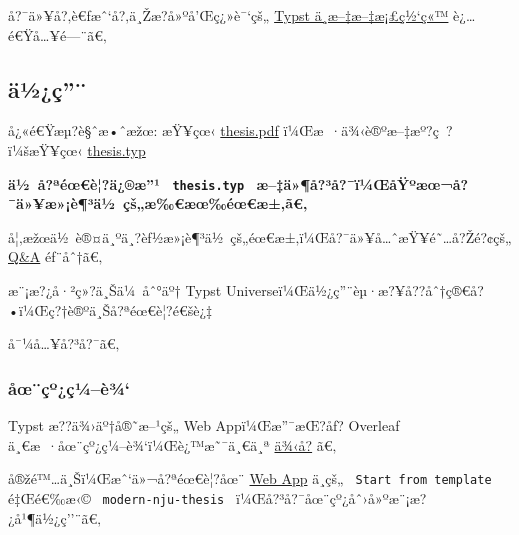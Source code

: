 å?¯ä»¥å?‚è€ƒæˆ`å?‚ä¸Žæ?­å»ºå'Œç¿»è¯`çš„
\href{https://typst-doc-cn.github.io/docs/}{Typst ä¸­æ--‡æ--‡æ¡£ç½`ç«™}
è¿\ldots é€Ÿå\ldots¥é---¨ã€‚

\subsection{ä½¿ç''¨}\label{uxe4uxbduxe7}

å¿«é€Ÿæµ?è§ˆæ•ˆæžœ: æŸ¥çœ‹
\href{https://github.com/nju-lug/modern-nju-thesis/releases/latest/download/thesis.pdf}{thesis.pdf}
ï¼Œæ~·ä¾‹è®ºæ--‡æº?ç~?ï¼šæŸ¥çœ‹
\href{https://github.com/nju-lug/modern-nju-thesis/blob/main/template/thesis.typ}{thesis.typ}

\textbf{ä½~å?ªéœ€è¦?ä¿®æ''¹ \texttt{\ thesis.typ\ }
æ--‡ä»¶å?³å?¯ï¼ŒåŸºæœ¬å?¯ä»¥æ»¡è¶³ä½~çš„æ‰€æœ‰éœ€æ±‚ã€‚}

å¦‚æžœä½~è®¤ä¸ºä¸?èƒ½æ»¡è¶³ä½~çš„éœ€æ±‚ï¼Œå?¯ä»¥å\ldots ˆæŸ¥é˜\ldots å?Žé?¢çš„
\href{https://github.com/typst/packages/raw/main/packages/preview/modern-nju-thesis/0.3.4/\#Q\%26A}{Q\&A}
éƒ¨åˆ†ã€‚

æ¨¡æ?¿å·²ç»?ä¸Šä¼~åˆ°äº† Typst
Universeï¼Œä½¿ç''¨èµ·æ?¥å??åˆ†ç®€å?•ï¼Œç?†è®ºä¸Šå?ªéœ€è¦?é€šè¿‡

\begin{Shaded}
\begin{Highlighting}[]
\end{Highlighting}
\end{Shaded}

å¯¼å\ldots¥å?³å?¯ã€‚

\subsubsection{åœ¨çº¿ç¼--è¾`}\label{uxe5ux153uxe7uxbauxe7uxbcuxe8uxbe}

Typst æ??ä¾›äº†å®˜æ--¹çš„ Web Appï¼Œæ''¯æŒ?åƒ? Overleaf
ä¸€æ~·åœ¨çº¿ç¼--è¾`ï¼Œè¿™æ˜¯ä¸€ä¸ª
\href{https://typst.app/project/rgiwHIjdPOnXr9HJb8H0oa}{ä¾‹å­?} ã€‚

å®žé™\ldots ä¸Šï¼Œæˆ`ä»¬å?ªéœ€è¦?åœ¨
\href{https://typst.app/?template=modern-nju-thesis&version=0.3.4}{Web
App} ä¸­çš„ \texttt{\ Start\ from\ template\ } é‡Œé€‰æ‹©
\texttt{\ modern-nju-thesis\ } ï¼Œå?³å?¯åœ¨çº¿åˆ›å»ºæ¨¡æ?¿å¹¶ä½¿ç''¨ã€‚



